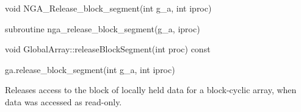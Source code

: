 \documentclass[10pt]{article}
\begin{document}


\begin{capi}
\begin{ccode}
void NGA_Release_block_segment(int g_a, int iproc)
\end{ccode}
\begin{funcargs}
\end{funcargs}
\end{capi}

\begin{fapi}
\begin{fcode}
subroutine nga_release_block_segment(g_a, iproc)
\end{fcode}
\begin{funcargs}
\end{funcargs}
\end{fapi}

\begin{cxxapi}
\begin{cxxcode}
void GlobalArray::releaseBlockSegment(int proc) const
\end{cxxcode}
\begin{funcargs}
\end{funcargs}
\end{cxxapi}

\begin{pyapi}
\begin{pycode}
ga.release_block_segment(int g_a, int iproc)
\end{pycode}
\begin{funcargs}
\end{funcargs}
\end{pyapi}

\local

\begin{desc}

Releases access to the block of locally held data for a block-cyclic array,
when data was accessed as read-only.

\end{desc}


\end{document}
